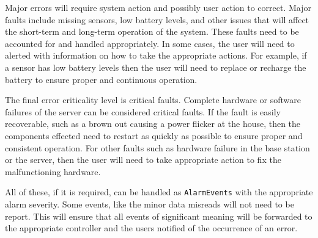\documentclass{report}
\begin{document}
Major errors will require system action and possibly user action to correct.
Major faults include missing sensors, low battery levels, and other issues that
will affect the short-term and long-term operation of the system. These faults
need to be accounted for and handled appropriately. In some cases, the user
will need to alerted with information on how to take the appropriate actions.
For example, if a sensor has low battery levels then the user will need to
replace or recharge the battery to ensure proper and continuous operation.

The final error criticality level is critical faults. Complete hardware or
software failures of the server can be considered critical faults. If the fault
is easily recoverable, such as a brown out causing a power flicker at the
house, then the components effected need to restart as quickly as possible to
ensure proper and consistent operation. For other faults such as hardware
failure in the base station or the server, then the user will need to take
appropriate action to fix the malfunctioning hardware.

All of these, if it is required, can be handled as \texttt{AlarmEvents} with
the appropriate alarm severity. Some events, like the minor data misreads will
not need to be report. This will ensure that all events of significant meaning
will be forwarded to the appropriate controller and the users notified of the
occurrence of an error.
\end{document}
